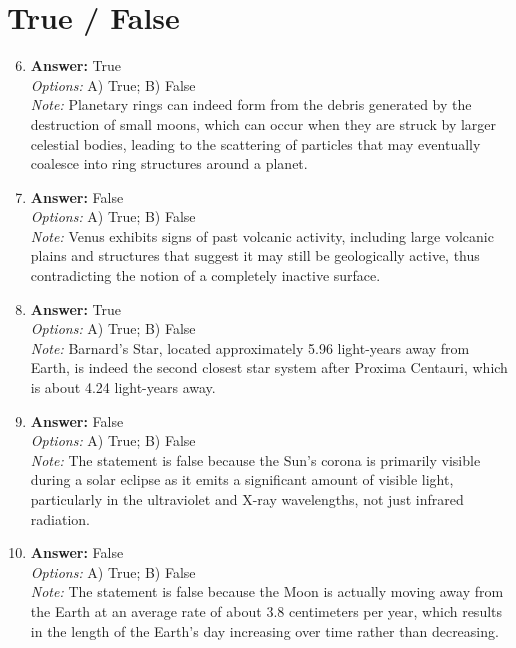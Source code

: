 \documentclass[12pt]{article}
\begin{document}
\section*{True / False}
\begin{enumerate}[label=\arabic*.]
\setcounter{enumi}{5}
\item \textbf{Answer:} True
\\ \textit{Options:} A) True; B) False
\\ \textit{Note:} Planetary rings can indeed form from the debris generated by the destruction of small moons, which can occur when they are struck by larger celestial bodies, leading to the scattering of particles that may eventually coalesce into ring structures around a planet.
\item \textbf{Answer:} False
\\ \textit{Options:} A) True; B) False
\\ \textit{Note:} Venus exhibits signs of past volcanic activity, including large volcanic plains and structures that suggest it may still be geologically active, thus contradicting the notion of a completely inactive surface.
\item \textbf{Answer:} True
\\ \textit{Options:} A) True; B) False
\\ \textit{Note:} Barnard's Star, located approximately 5.96 light-years away from Earth, is indeed the second closest star system after Proxima Centauri, which is about 4.24 light-years away.
\item \textbf{Answer:} False
\\ \textit{Options:} A) True; B) False
\\ \textit{Note:} The statement is false because the Sun's corona is primarily visible during a solar eclipse as it emits a significant amount of visible light, particularly in the ultraviolet and X-ray wavelengths, not just infrared radiation.
\item \textbf{Answer:} False
\\ \textit{Options:} A) True; B) False
\\ \textit{Note:} The statement is false because the Moon is actually moving away from the Earth at an average rate of about 3.8 centimeters per year, which results in the length of the Earth's day increasing over time rather than decreasing.
\end{enumerate}
\end{document}
